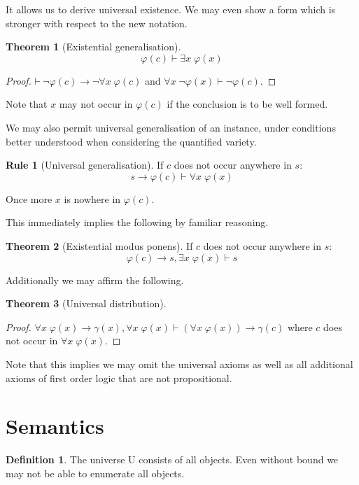\documentclass{amsbook}
\newcommand{\infers}{\mathrel\vdash}
\newcommand{\theorem}{\mathord\vdash\medspace}
\newcommand{\univ}[1]{\mathord\forall#1\;}
\newcommand{\exis}[1]{\mathord\exists#1\;}
\newcommand{\then}{\mathrel\rightarrow}
\theoremstyle{definition}
\newtheorem{frule}{Rule}[chapter]
\newtheorem{thm}{Theorem}[section]
\newtheorem{dfn}{Definition}[section]
\begin{document}
It allows us to derive universal existence. We may even show a form which is stronger with respect to the new notation.

\begin{thm}[Existential generalisation]
    $$\varphi(c) \infers \exis x \varphi(x)$$
    \begin{proof}
        $\theorem \neg\varphi(c) \then \neg\univ x \varphi(c)$ and $\univ x \neg\varphi(x) \infers \neg\varphi(c)$.
    \end{proof}
\end{thm}

Note that $x$ may not occur in $\varphi(c)$ if the conclusion is to be well formed.

We may also permit universal generalisation of an instance, under conditions better understood when considering the quantified variety.

\begin{frule}[Universal generalisation] If $c$ does not occur anywhere in $s$:
    $$s \then \varphi(c) \infers \univ x \varphi(x)$$
\end{frule}

Once more $x$ is nowhere in $\varphi(c)$.

This immediately implies the following by familiar reasoning.

\begin{thm}[Existential modus ponens]  If $c$ does not occur anywhere in $s$:
    $$\varphi(c) \then s, \exis x \varphi(x) \infers s$$
\end{thm}

Additionally we may affirm the following.

\begin{thm}[Universal distribution]
    $\;$
    \begin{proof}
        $\univ x \varphi(x) \then \gamma(x), \univ x \varphi(x) \infers (\univ x \varphi(x)) \then \gamma(c)$ where $c$ does not occur in $\univ x \varphi(x)$.
    \end{proof}
\end{thm}

Note that this implies we may omit the universal axioms as well as all additional axioms of first order logic that are not propositional.

\section{Semantics}

\begin{dfn}
    The universe $\mathrm U$ consists of all objects. Even without bound we may not be able to enumerate all objects.
\end{dfn}
\end{document}
